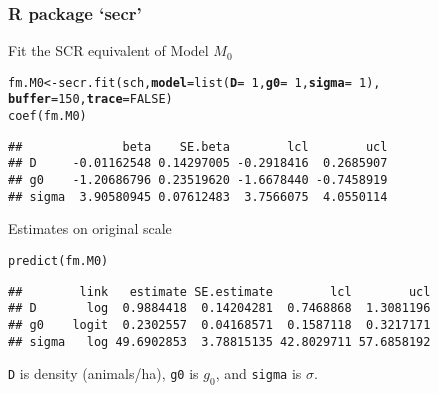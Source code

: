 \documentclass[color=usenames,dvipsnames]{beamer}\usepackage[]{graphicx}\usepackage[]{color}
\makeatletter
\newcommand{\hlnum}[1]{\textcolor[rgb]{0.69,0.494,0}{#1}}%
\newcommand{\hlopt}[1]{\textcolor[rgb]{0,0,0}{#1}}%
\newcommand{\hlstd}[1]{\textcolor[rgb]{0,0,0}{#1}}%
\newcommand{\hlkwb}[1]{\textcolor[rgb]{0,0.341,0.682}{#1}}%
\newcommand{\hlkwc}[1]{\textcolor[rgb]{0,0,0}{\textbf{#1}}}%
\newcommand{\hlkwd}[1]{\textcolor[rgb]{0.004,0.004,0.506}{#1}}%
\newenvironment{kframe}{%
 \def\at@end@of@kframe{}%
 \ifinner\ifhmode%
  \def\at@end@of@kframe{\end{minipage}}%
  \begin{minipage}{\columnwidth}%
 \fi\fi%
 \def\FrameCommand##1{\hskip\@totalleftmargin \hskip-\fboxsep
 \colorbox{shadecolor}{##1}\hskip-\fboxsep
     \hskip-\linewidth \hskip-\@totalleftmargin \hskip\columnwidth}%
 \MakeFramed {\advance\hsize-\width
   \@totalleftmargin\z@ \linewidth\hsize
   \@setminipage}}%
 {\par\unskip\endMakeFramed%
 \at@end@of@kframe}
\newenvironment{knitrout}{}{} %
\newcommand{\inr}[1]{\colorbox{inlinecolor}{\texttt{#1}}}
\makeatother
\begin{document}
\begin{frame}[fragile]
  \frametitle{R package `secr'}
  Fit the SCR equivalent of Model $M_0$
\begin{knitrout}\scriptsize
{}\color{fgcolor}\begin{kframe}
\begin{alltt}
\hlstd{fm.M0} \hlkwb{<-} \hlkwd{secr.fit}\hlstd{(sch,} \hlkwc{model}\hlstd{=}\hlkwd{list}\hlstd{(}\hlkwc{D}\hlstd{=}\hlopt{~}\hlnum{1}\hlstd{,} \hlkwc{g0}\hlstd{=}\hlopt{~}\hlnum{1}\hlstd{,} \hlkwc{sigma}\hlstd{=}\hlopt{~}\hlnum{1}\hlstd{),}
                  \hlkwc{buffer}\hlstd{=}\hlnum{150}\hlstd{,} \hlkwc{trace}\hlstd{=}\hlnum{FALSE}\hlstd{)}
\hlkwd{coef}\hlstd{(fm.M0)}
\end{alltt}
\begin{verbatim}
##              beta    SE.beta        lcl        ucl
## D     -0.01162548 0.14297005 -0.2918416  0.2685907
## g0    -1.20686796 0.23519620 -1.6678440 -0.7458919
## sigma  3.90580945 0.07612483  3.7566075  4.0550114
\end{verbatim}
\end{kframe}
\end{knitrout}
\pause
\vfill
Estimates on original scale
\begin{knitrout}\scriptsize
{}\color{fgcolor}\begin{kframe}
\begin{alltt}
\hlkwd{predict}\hlstd{(fm.M0)}
\end{alltt}
\begin{verbatim}
##        link   estimate SE.estimate        lcl        ucl
## D       log  0.9884418  0.14204281  0.7468868  1.3081196
## g0    logit  0.2302557  0.04168571  0.1587118  0.3217171
## sigma   log 49.6902853  3.78815135 42.8029711 57.6858192
\end{verbatim}
\end{kframe}
\end{knitrout}
\inr{D} is density (animals/ha), \inr{g0} is $g_0$, and \inr{sigma} is 
$\sigma$.   
\end{frame}
\end{document}
